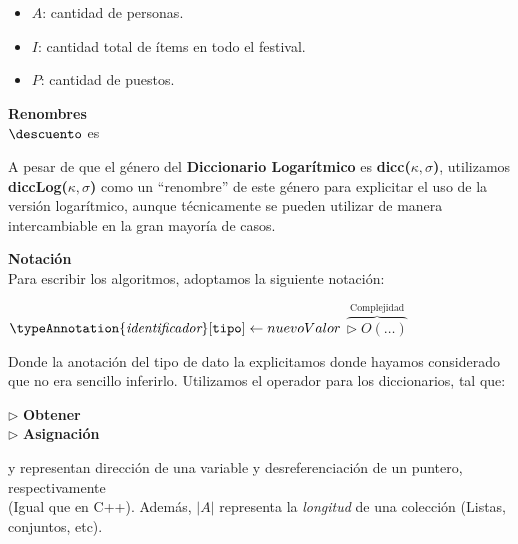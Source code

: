 \documentclass[10pt, a4paper]{article}
\begin{document}
\pagestyle{plain}
\maketitle
\tableofcontents
\thispagestyle{empty}
\newpage

\pagestyle{plain}

\aclaraciones

\begin{itemize}
    \item $A$: cantidad de personas.
    \item $I$: cantidad total de ítems en todo el festival.
    \item $P$: cantidad de puestos.
\end{itemize}

{\large\bfseries Renombres}\\
$\descuento$ es \nln

A pesar de que el género del \textbf{Diccionario Logarítmico} es \textbf{dicc($\kappa, \sigma$)}, utilizamos \textbf{diccLog($\kappa, \sigma$)} como un ``renombre'' de este género para explicitar el uso de la versión logarítmico, aunque técnicamente se pueden utilizar
de manera intercambiable en la gran mayoría de casos. \nln \nln

{\large\bfseries Notación}\\
Para escribir los algoritmos, adoptamos la siguiente notación:%
\begin{center}%
$\typeAnnotation{\textit{identificador}}[\mono{tipo}] \gets nuevoValor$   $\overbrace{\triangleright\; O(\dots)}^{\text{Complejidad}}$%
\end{center}%

Donde la anotación del tipo de dato la explicitamos donde hayamos considerado que no era sencillo inferirlo. \nln
Utilizamos el operador \mono{[]} para los diccionarios, tal que: \nln

$\triangleright$ \textbf{Obtener}  \\
$\triangleright$ \textbf{Asignación} 
\par\vspace{5mm}
\mono{\&} y \mono{*} representan dirección de una variable y desreferenciación de un puntero, respectivamente \\(Igual que en C++).
\nln
Además, $|A|$ representa la \textit{longitud} de una colección (Listas, conjuntos, etc). \nln \nln
\end{document}
